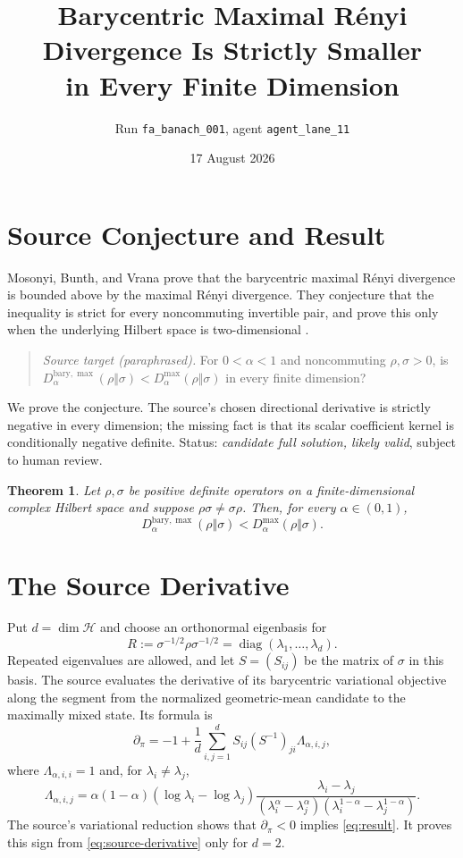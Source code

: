 \documentclass[11pt]{article}
\title{Barycentric Maximal R\'enyi Divergence Is Strictly Smaller\\
in Every Finite Dimension}
\author{Run \texttt{fa\_banach\_001}, agent \texttt{agent\_lane\_11}}
\date{17 August 2026}
\newtheorem{theorem}{Theorem}
\newcommand{\diag}{\operatorname{diag}}
\begin{document}
\maketitle

\section*{Source Conjecture and Result}

Mosonyi, Bunth, and Vrana prove that the barycentric maximal R\'enyi
divergence is bounded above by the maximal R\'enyi divergence.  They
conjecture that the inequality is strict for every noncommuting invertible
pair, and prove this only when the underlying Hilbert space is
two-dimensional \cite[Sec.~6.4]{MBV}.

\begin{quote}
\small
\emph{Source target (paraphrased).}  For $0<\alpha<1$ and noncommuting
$\rho,\sigma>0$, is
$D_\alpha^{\mathrm{bary},\max}(\rho\Vert\sigma)
 <D_\alpha^{\max}(\rho\Vert\sigma)$ in every finite dimension?
\end{quote}

We prove the conjecture.  The source's chosen directional derivative is
strictly negative in every dimension; the missing fact is that its scalar
coefficient kernel is conditionally negative definite.  Status:
\emph{candidate full solution, likely valid}, subject to human review.

\begin{theorem}\label{thm:main}
Let $\rho,\sigma$ be positive definite operators on a finite-dimensional
complex Hilbert space and suppose $\rho\sigma\ne\sigma\rho$.  Then, for every
$\alpha\in(0,1)$,
\[
 D_\alpha^{\mathrm{bary},\max}(\rho\Vert\sigma)
 <
 D_\alpha^{\max}(\rho\Vert\sigma).
 \tag{1}\label{eq:result}
\]
\end{theorem}

\section*{The Source Derivative}

Put $d=\dim\mathcal H$ and choose an orthonormal eigenbasis for
\[
 R:=\sigma^{-1/2}\rho\sigma^{-1/2}
   =\diag(\lambda_1,\ldots,\lambda_d).
\]
Repeated eigenvalues are allowed, and let $S=(S_{ij})$ be the matrix of
$\sigma$ in this basis.  The source evaluates the derivative of its
barycentric variational objective along the segment from the normalized
geometric-mean candidate to the maximally mixed state.  Its formula is
\[
 \partial_\pi
 =-1+\frac1d\sum_{i,j=1}^d
 S_{ij}(S^{-1})_{ji}\Lambda_{\alpha,i,j},
 \tag{2}\label{eq:source-derivative}
\]
where $\Lambda_{\alpha,i,i}=1$ and, for $\lambda_i\ne\lambda_j$,
\[
 \Lambda_{\alpha,i,j}
 =\alpha(1-\alpha)
 (\log\lambda_i-\log\lambda_j)
 \frac{\lambda_i-\lambda_j}
 {(\lambda_i^\alpha-\lambda_j^\alpha)
  (\lambda_i^{1-\alpha}-\lambda_j^{1-\alpha})}.
 \tag{3}\label{eq:Lambda}
\]
The source's variational reduction shows that $\partial_\pi<0$ implies
\eqref{eq:result}.  It proves this sign from \eqref{eq:source-derivative}
only for $d=2$.
\end{document}

